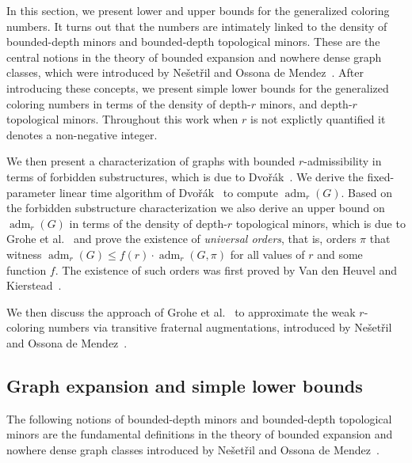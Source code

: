 \documentclass[1p,number,a4paper]{elsarticle}
\theoremstyle{remark}
\DeclareMathOperator{\adm}{adm}
\begin{document}
In this section, we present lower and upper bounds for 
the generalized
coloring numbers. It turns out that the numbers are intimately
linked to the density of bounded-depth minors and bounded-depth topological minors. These are the central notions in the theory of bounded expansion
and nowhere dense graph classes, which were introduced by 
Ne\v{s}et\v{r}il and Ossona de Mendez~\cite{nevsetvril2008grad,
nevsetvril2011nowhere}. After introducing these concepts, we 
present simple lower bounds for the generalized coloring numbers in terms of the density of depth-$r$ minors,
and depth-$r$ topological minors. 
Throughout this work when $r$ is not explictly quantified it denotes a non-negative integer. 

We then 
present a characterization of graphs with bounded $r$-admissibility
in terms of forbidden substructures, which is due to Dvo\v{r}\'ak~\cite{dvovrak2013constant}. We derive the fixed-parameter
linear time algorithm of Dvo\v{r}\'ak~\cite{dvovrak2013constant}
to compute $\adm_r(G)$. Based on the forbidden substructure characterization we also derive an upper bound on $\adm_r(G)$
in terms of the density of depth-$r$ topological minors, which
is due to Grohe et al.~\cite{grohe2015colouring} and prove the existence
of \emph{universal orders}, that is, orders $\pi$ that witness 
$\adm_r(G)\leq f(r)\cdot \adm_r(G,\pi)$ for all values of $r$
and some function $f$. The existence of such orders 
was first proved by Van den Heuvel and Kierstead~\cite{vdH18}. 

We then discuss the approach of Grohe et al.~\cite{grohe2017deciding} to approximate the weak $r$-coloring numbers via transitive fraternal augmentations, introduced by Ne\v{s}et\v{r}il and Ossona de Mendez~\cite{nevsetvril2008grad}. 


\subsection{Graph expansion and simple lower bounds}

The following notions of bounded-depth minors and bounded-depth
topological minors are the fundamental definitions in the theory of bounded
expansion and nowhere dense graph classes introduced by Ne\v{s}et\v{r}il and Ossona de Mendez~\cite{nevsetvril2008grad,
nevsetvril2011nowhere}. 
\end{document}
